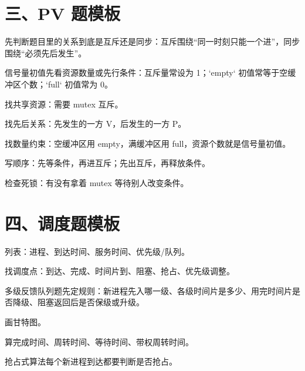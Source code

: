 \section*{三、PV 题模板}
{}
\begin{points}
  \item 先判断题目里的关系到底是互斥还是同步：互斥围绕“同一时刻只能一个进”，同步围绕“必须先后发生”。
  \item 信号量初值先看资源数量或先行条件：互斥量常设为 1；`empty` 初值常等于空缓冲区个数；`full` 初值常为 0。
  \item 找共享资源：需要 mutex 互斥。
  \item 找先后关系：先发生的一方 V，后发生的一方 P。
  \item 找数量约束：空缓冲区用 empty，满缓冲区用 full，资源个数就是信号量初值。
  \item 写顺序：先等条件，再进互斥；先出互斥，再释放条件。
  \item 检查死锁：有没有拿着 mutex 等待别人改变条件。
\end{points}

\section*{四、调度题模板}
{}
\begin{points}
  \item 列表：进程、到达时间、服务时间、优先级/队列。
  \item 找调度点：到达、完成、时间片到、阻塞、抢占、优先级调整。
  \item 多级反馈队列题先定规则：新进程先入哪一级、各级时间片是多少、用完时间片是否降级、阻塞返回后是否保级或升级。
  \item 画甘特图。
  \item 算完成时间、周转时间、等待时间、带权周转时间。
  \item 抢占式算法每个新进程到达都要判断是否抢占。
\end{points}

